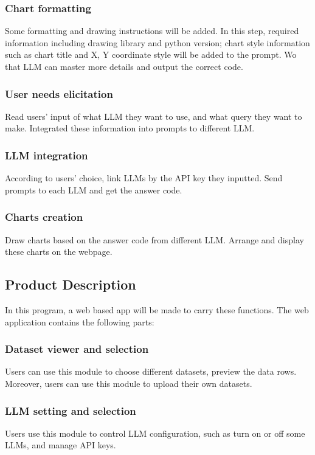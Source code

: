 \documentclass[conference]{IEEEtran}
\begin{document}
\subsubsection{Chart formatting}
Some formatting and drawing instructions will be added. In this step, required information including drawing library and python version; chart style information such as chart title and X, Y coordinate style will be added to the prompt. Wo that LLM can master more details and output the correct code.

\subsubsection{User needs elicitation}
Read users' input of what LLM they want to use, and what query they want to make. Integrated these information into prompts to different LLM.

\subsubsection{LLM integration}
According to users' choice, link LLMs by the API key they inputted. Send prompts to each LLM and get the answer code.

\subsubsection{Charts creation}
Draw charts based on the answer code from different LLM. Arrange and display these charts on the webpage.

\subsection{Product Description}
In this program, a web based app will be made to carry these functions. The web application contains the following parts:

\subsubsection{Dataset viewer and selection}
Users can use this module to choose different datasets, preview the data rows. Moreover, users can use this module to upload their own datasets.

\subsubsection{LLM setting and selection}
Users use this module to control LLM configuration, such as turn on or off some LLMs, and manage API keys.
\end{document}
